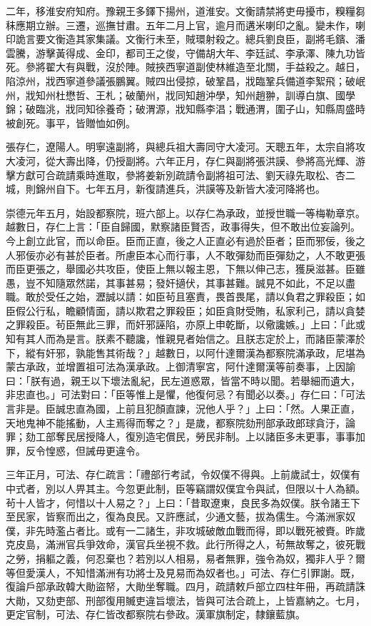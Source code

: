 \begin{pinyinscope}
二年，移淮安府知府。豫親王多鐸下揚州，道淮安。文衡請禁將吏毋擾市，糗糧芻秣應期立辦。三遷，巡撫甘肅。五年二月上官，逾月而遘米喇印之亂。變未作，喇印詭言要文衡造其家集議。文衡行未至，賊環射殺之。總兵劉良臣，副將毛鑌、潘雲騰，游擊黃得成、金印，都司王之俊，守備胡大年、李廷試、李承澤、陳九功皆死。參將翟大有與戰，沒於陣。賊挾西寧道副使林維造至北關，手益殺之。越日，陷涼州，戕西寧道參議張鵬翼。賊四出侵掠，破鞏昌，戕臨鞏兵備道李絮飛；破岷州，戕知州杜懋哲、王札；破蘭州，戕同知趙沖學，知州趙翀，訓導白旗、國學錦；破臨洮，戕同知徐養奇；破渭源，戕知縣李淐；戰通渭，圍子山，知縣周盛時被創死。事平，皆贈恤如例。

張存仁，遼陽人。明寧遠副將，與總兵祖大壽同守大凌河。天聰五年，太宗自將攻大凌河，從大壽出降，仍授副將。六年正月，存仁與副將張洪謨、參將高光輝、游擊方獻可合疏請乘時進取，參將姜新別疏請令副將祖可法、劉天祿先取松、杏二城，則錦州自下。七年五月，新復請進兵，洪謨等及新皆大凌河降將也。

崇德元年五月，始設都察院，班六部上。以存仁為承政，並授世職一等梅勒章京。越數日，存仁上言：「臣自歸國，默察諸臣賢否，政事得失，但不敢出位妄論列。今上創立此官，而以命臣。臣而正直，後之人正直必有過於臣者；臣而邪佞，後之人邪佞亦必有甚於臣者。所慮臣本心而行事，人不敢彈劾而臣彈劾之，人不敢更張而臣更張之，舉國必共攻臣，使臣上無以報主恩，下無以伸己志，獲戾滋甚。臣雖愚，豈不知隨眾然諾，其事甚易；發奸擿伏，其事甚難。誠見不如此，不足以盡職。敢於受任之始，瀝誠以請：如臣茍且塞責，畏首畏尾，請以負君之罪殺臣；如臣假公行私，瞻顧情面，請以欺君之罪殺臣；如臣貪財受賄，私家利己，請以貪婪之罪殺臣。茍臣無此三罪，而奸邪誣陷，亦原上申乾斷，以儆讒嫉。」上曰：「此或知有其人而為是言。朕素不聽讒，惟親見者始信之。且朕志定於上，而諸臣蒙澤於下，縱有奸邪，孰能售其術哉？」越數日，以阿什達爾漢為都察院滿承政，尼堪為蒙古承政，並增置祖可法為漢承政。上御清寧宮，阿什達爾漢等前奏事，上因諭曰：「朕有過，親王以下壞法亂紀，民左道惑眾，皆當不時以聞。若舉細而遺大，非忠直也。」可法對曰：「臣等惟上是懼，他復何忌？有聞必以奏。」存仁曰：「可法言非是。臣誠忠直為國，上前且犯顏直諫，況他人乎？」上曰：「然。人果正直，天地鬼神不能搖動，人主焉得而奪之？」是歲，都察院劾刑部承政郎球貪汙，論罪；劾工部奪民居授降人，復別造宅償民，勞民非制。上以諸臣多未更事，事事加罪，反令惶惑，但誡毋更違令。

三年正月，可法、存仁疏言：「禮部行考試，令奴僕不得與。上前歲試士，奴僕有中式者，別以人畀其主。今忽更此制，臣等竊謂奴僕宜令與試，但限以十人為額。茍十人皆才，何惜以十人易之？」上曰：「昔取遼東，良民多為奴僕。朕令諸王下至民家，皆察而出之，復為良民。又許應試，少通文藝，拔為儒生。今滿洲家奴僕，非先時濫占者比。或有一二諸生，非攻城破敵血戰而得，即以戰死被賚。昨歲克皮島，滿洲官兵爭效命，漢官兵坐視不救。此行所得之人，茍無故奪之，彼死戰之勞，捐軀之義，何忍棄也？若別以人相易，易者無罪，強令為奴，獨非人乎？爾等但愛漢人，不知惜滿洲有功將士及見易而為奴者也。」可法、存仁引罪謝。既，復論戶部承政韓大勛盜帑，大勛坐奪職。四月，疏請敕戶部立四柱年冊，再疏請誅大勛，又劾吏部、刑部復用贓吏違旨壞法，皆與可法合疏上，上皆嘉納之。七月，更定官制，可法、存仁皆改都察院右參政。漢軍旗制定，隸鑲藍旗。


\end{pinyinscope}
